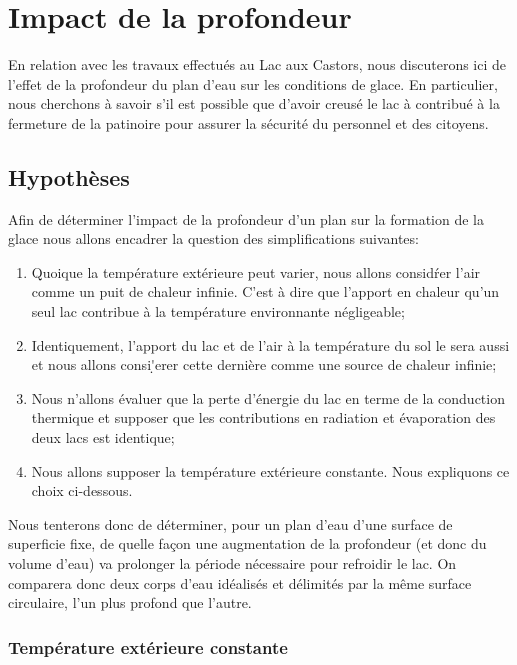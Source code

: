 \documentclass[12pt]{article}
\begin{document}
\section{Impact de la profondeur}

En relation avec les travaux effectu\'es au Lac aux Castors, nous discuterons ici de l'effet de la
profondeur du plan d'eau sur les conditions de glace. En particulier, nous cherchons \`a savoir s'il est
possible que d'avoir creus\'e\cite{Lac} le lac \`a contribu\'e \`a la fermeture de la patinoire pour
assurer la s\'ecurit\'e du personnel et des citoyens.

\subsection{Hypoth\`eses}

Afin de d\'eterminer l'impact de la profondeur d'un plan sur la formation de la glace nous allons
encadrer la question des simplifications suivantes:

\begin{enumerate}
    \item Quoique la temp\'erature ext\'erieure peut varier, nous allons consid\'rer l'air comme un puit
        de chaleur infinie. C'est \`a dire que l'apport en chaleur qu'un seul lac contribue \`a la temp\'erature
        environnante n\'egligeable;
    \item Identiquement, l'apport du lac et de l'air \`a la temp\'erature du sol le sera aussi et nous
        allons consi\d'erer cette derni\`ere comme une source de chaleur infinie;
    \item Nous n'allons \'evaluer que la perte d'\'energie du lac en terme de la conduction thermique et
        supposer que les contributions en radiation et \'evaporation des deux lacs est identique;
    \item Nous allons supposer la temp\'erature ext\'erieure constante. Nous expliquons ce choix
        ci-dessous.
\end{enumerate}

Nous tenterons donc de d\'eterminer, pour un plan d'eau d'une surface de superficie fixe, de quelle fa\c
con une augmentation de la profondeur (et donc du volume d'eau) va prolonger la p\'eriode n\'ecessaire
pour refroidir le lac. On comparera donc deux corps d'eau id\'ealis\'es et d\'elimit\'es par la m\^eme
surface circulaire, l'un plus profond que l'autre.

\subsubsection{Temp\'erature ext\'erieure constante}
\end{document}
